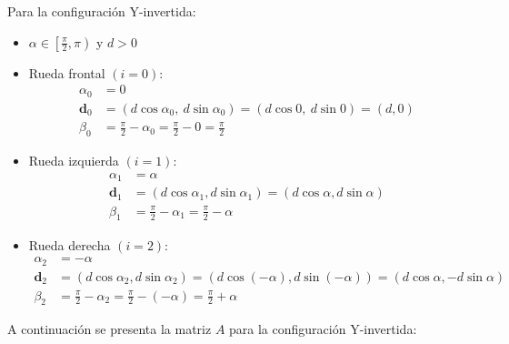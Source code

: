 \documentclass[11pt,a4paper]{article}
\newcommand{\vect}[1]{\bm{#1}}       %
\begin{document}
Para la configuración Y-invertida:

\begin{itemize}
    \item \(\alpha \in \left[\frac{\pi}{2}, \pi\right)\) y \(d > 0\)
    \item Rueda frontal \((i = 0)\):
          \[
              \begin{aligned}
                  \alpha_0   & = 0                                                              \\
                  \vect{d}_0 & = (d\cos\alpha_0,\ d\sin\alpha_0) = (d\cos 0,\ d\sin 0) = (d, 0) \\
                  \beta_0    & =\frac{\pi}{2} - \alpha_0 = \frac{\pi}{2} - 0 = \frac{\pi}{2}
              \end{aligned}
          \]
    \item Rueda izquierda \((i = 1)\):
          \[
              \begin{aligned}
                  \alpha_1   & = \alpha                                                      \\
                  \vect{d}_1 & = (d\cos\alpha_1, d\sin\alpha_1) = (d\cos\alpha, d\sin\alpha) \\
                  \beta_1    & = \frac{\pi}{2} - \alpha_1 = \frac{\pi}{2} - \alpha
              \end{aligned}
          \]
    \item Rueda derecha \((i = 2)\):
          \[
              \begin{aligned}
                  \alpha_2   & = -\alpha                                                                                         \\
                  \vect{d}_2 & = (d\cos\alpha_2, d\sin\alpha_2) = (d\cos(-\alpha), d\sin(-\alpha)) = (d\cos\alpha, -d\sin\alpha) \\
                  \beta_2    & = \frac{\pi}{2} - \alpha_2 = \frac{\pi}{2} - (-\alpha) = \frac{\pi}{2} + \alpha
              \end{aligned}
          \]
\end{itemize}

A continuación se presenta la matriz \(A\) para la configuración Y-invertida:
\end{document}

